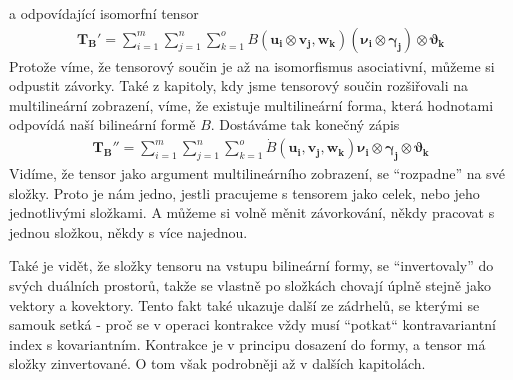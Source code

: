 \documentclass[a5paper,12pt]{amsbook}
\theoremstyle{definition}
\newcommand{\myvec}[1]{\bm{#1}}
\begin{document}
a odpovídající isomorfní tensor
\begin{equation*}
\begin{split}
\myvec{T_B}' =
  \sum_{i=1}^{m}\sum_{j=1}^{n}\sum_{k=1}^{o} B(\myvec{u_i}\otimes\myvec{v_j}, \myvec{w_k})
    (\myvec{\nu_i}\otimes\myvec{\gamma_j})\otimes\myvec{\vartheta_k}
\end{split}
\end{equation*}
Protože víme, že tensorový součin je až na isomorfismus asociativní, můžeme si odpustit závorky.
Také z kapitoly, kdy jsme tensorový součin rozšiřovali na multilineární zobrazení, víme, že existuje
multilineární forma, která hodnotami odpovídá naší bilineární formě $B$. Dostáváme tak konečný
zápis
\begin{equation*}
\begin{split}
\myvec{T_B}'' =
  \sum_{i=1}^{m}\sum_{j=1}^{n}\sum_{k=1}^{o} \dot{B}(\myvec{u_i}, \myvec{v_j}, \myvec{w_k})
    \myvec{\nu_i}\otimes\myvec{\gamma_j}\otimes\myvec{\vartheta_k}
\end{split}
\end{equation*}
Vidíme, že tensor jako argument multilineárního zobrazení, se ``rozpadne'' na své složky. Proto je nám
jedno, jestli pracujeme s tensorem jako celek, nebo jeho jednotlivými složkami. A můžeme si volně
měnit závorkování, někdy pracovat s jednou složkou, někdy s více najednou.

Také je vidět, že složky tensoru na vstupu bilineární formy, se ``invertovaly'' do svých duálních
prostorů, takže se vlastně po složkách chovají úplně stejně jako vektory a kovektory. Tento fakt
také ukazuje další ze zádrhelů, se kterými se samouk setká - proč se v operaci kontrakce vždy musí
``potkat`` kontravariantní index s kovariantním. Kontrakce je v principu dosazení do formy, a tensor
má složky zinvertované. O tom však podrobněji až v dalších kapitolách.
\end{document}
